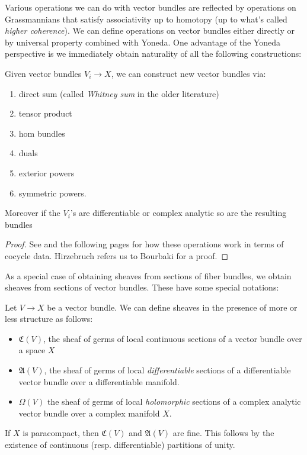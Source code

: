 \documentclass[11pt]{amsart}
\begin{document}
Various operations we can do with vector bundles are reflected by operations on Grassmannians that satisfy associativity up to homotopy (up to what's called \emph{higher coherence}). We can define operations on vector bundles either directly or by universal property combined with Yoneda. One advantage of the Yoneda perspective is we immediately obtain naturality of all the following constructions:

\begin{proposition} Given vector bundles $V_i \to X$, we can construct new vector bundles via:
\begin{enumerate}
    \item direct sum (called \emph{Whitney sum} in the older literature)
    \item tensor product
    \item hom bundles
    \item duals
    \item exterior powers
    \item symmetric powers.
\end{enumerate}
Moreover if the $V_i$'s are differentiable or complex analytic so are the resulting bundles
\end{proposition}
\begin{proof} See \cite[3.6.1]{Hirzebruch} and the following pages for how these operations work in terms of cocycle data. Hirzebruch refers us to Bourbaki for a proof.
\end{proof}

As a special case of obtaining sheaves from sections of fiber bundles, we obtain sheaves from sections of vector bundles. These have some special notations:

\begin{proposition}
Let $V \to X$ be a vector bundle. We can define sheaves in the presence of more or less structure as follows:
\begin{itemize}
    \item $\mathfrak{C}(V)$, the sheaf of germs of local continuous sections of a vector bundle over a space $X$
    \item $\mathfrak{A}(V)$, the sheaf of germs of local \emph{differentiable} sections of a differentiable vector bundle over a differentiable manifold.
    \item $\Omega(V)$ the sheaf of germs of local \emph{holomorphic} sections of a complex analytic vector bundle over a complex manifold $X$.
\end{itemize}
If $X$ is paracompact, then $\mathfrak{C}(V)$ and $\mathfrak{A}(V)$ are fine. This follows by the existence of continuous (resp. differentiable) partitions of unity.
\end{proposition}
\end{document}
